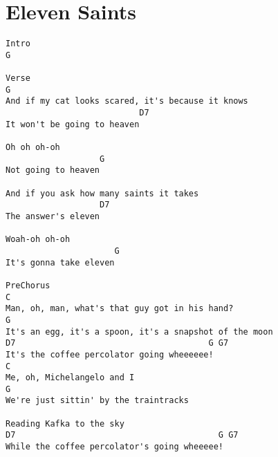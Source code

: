 \documentclass[leqno]{memoir}
\begin{document}
\chapter{Eleven Saints}
\begin{verbatim}
Intro
G

Verse
G
And if my cat looks scared, it's because it knows
                           D7
It won't be going to heaven

Oh oh oh-oh
                   G
Not going to heaven

And if you ask how many saints it takes
                   D7  
The answer's eleven

Woah-oh oh-oh
                      G
It's gonna take eleven

PreChorus
C
Man, oh, man, what's that guy got in his hand?
G
It's an egg, it's a spoon, it's a snapshot of the moon
D7                                       G G7
It's the coffee percolator going wheeeeee!
C
Me, oh, Michelangelo and I
G
We're just sittin' by the traintracks

Reading Kafka to the sky
D7                                         G G7
While the coffee percolator's going wheeeee!
\end{verbatim}
\newpage
\end{document}
